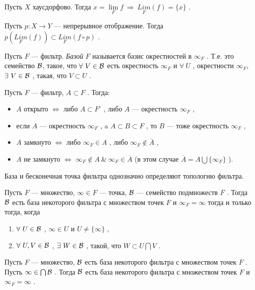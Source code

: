\SSsect Пусть \( X \) хаусдорфово. Тогда \( x = \lim\limits_{F} f ~\Rightarrow~ \underset{F}{Lim}(f) = \{x\} \) .

\SSsect Пусть \( p : X \rightarrow Y \) --- непрерывное отображение. Тогда \( p(\underset{F}{Lim}(f)) \subset \underset{F}{Lim}(f \circ p) \) .

\pagebreak

\SSbullet 

\SSsect[def] Пусть \( F \) --- фильтр. \textit{Базой} \( F \) называется базис окрестностей в \( \infty_F \) . Т.е. это семейство \( \mathcal{B} \), такое, что \( \forall~V \in \mathcal{B} \) есть окрестность \( \infty_F \) и \( \forall~U \) , окрестности \( \infty_F \), \( \exists~V \in \mathcal{B} \) , такая, что \( V \subset  U \) .

\SSsect Пусть \( F \) --- фильтр, \( A \subset F \) . Тогда:
\begin{itemize}[label=]
\item \( A \) открыто \( \Leftrightarrow \) либо \( A \subset F^{\circ} \) , либо \( A \) --- окрестность \( \infty_F \) ,
\item если \( A \) --- окрестность \( \infty_F \) , a \( A \subset B \subset F \) , то \( B \) --- тоже окрестность \( \infty_F \) ,
\item \( A \) замкнуто \( \Leftrightarrow \) либо \( \infty_F \in A \) , либо \( \infty_F \notin \overline{A} \) , 
\item \( A \) не замкнуто \( \Leftrightarrow \) \( \infty_F \notin A ~\&~ \infty_F \in \overline{A} \) (в этом случае \( \overline{A} = A \bigcup \{\infty_F\} \) ).
\end{itemize}

\SSsect База и бесконечная точка фильтра однозначно определяют топологию фильтра. 

\SSsect Пусть \( F \) --- множество, \( \infty \in F \) --- точка, \( \mathcal{B} \) --- семейство подмножеств \( F \) . Тогда \( \mathcal{B} \) есть база некоторого фильтра с множеством точек \( F \) и \( \infty_F = \infty \) тогда и только тогда, когда 
\begin{enumerate}[label={\alph*)}]
\item \( \forall~U \in \mathcal{B} \) , \( \infty \in U \) и \( U \neq \{\infty\} \) ,  
\item \( \forall~U,V \in \mathcal{B} \) , \( \exists~W \in \mathcal{B} \) , такой, что \( W \subset U\bigcap V \) .
\end{enumerate}

\SSsect Пусть \( F \) --- множество, \( \mathcal{B} \) есть база некоторого фильтра с множеством точек \( F \) . Пусть \( \infty \in \bigcap \mathcal{B} \) . Тогда \( \mathcal{B} \) есть база некоторого фильтра с множеством точек \( F \) и \( \infty_F = \infty \) .

